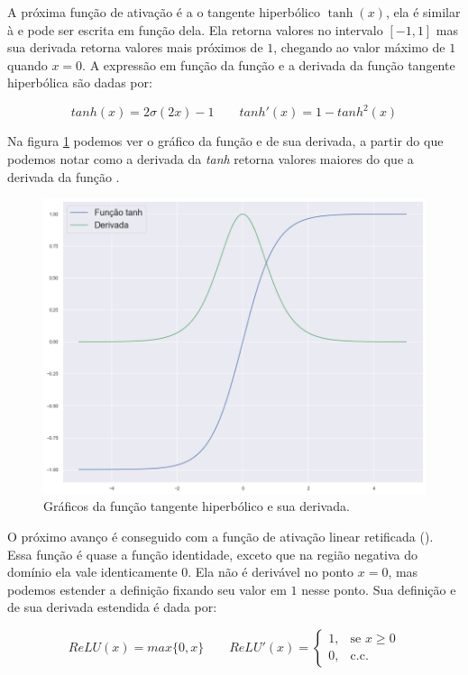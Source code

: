 A próxima função de ativação é a o tangente hiperbólico $\tanh(x)$, ela é similar à  e pode ser escrita em função dela. Ela retorna valores no intervalo $[-1, 1]$ mas sua derivada retorna valores mais próximos de $1$, chegando ao valor máximo de $1$ quando $x = 0$. A expressão em função da função  e a derivada da função tangente hiperbólica são dadas por:

\[ tanh(x)=2\sigma(2x) - 1   \quad \quad  tanh'(x)=1 - tanh^2(x) \]

Na figura \ref{fig:tanh} podemos ver o gráfico da função e de sua derivada, a partir do que podemos notar como a derivada da \emph{tanh} retorna valores maiores do que a derivada da função .

\begin{figure}[htb]
\centering
\includegraphics[width=12cm]{figuras/tanh}
\caption{Gráficos da função tangente hiperbólico e sua derivada.}
\label{fig:tanh}
\end{figure}

O próximo avanço é conseguido com a função de ativação linear retificada (). Essa função é quase a função identidade, exceto que na região negativa do domínio ela vale identicamente $0$. Ela não é derivável no ponto $x=0$, mas podemos estender a definição fixando seu valor em $1$ nesse ponto. Sua definição e de sua derivada estendida é dada por:

\[
ReLU(x)=max\{0, x\}   \quad \quad  ReLU'(x)=
	\begin{cases}
    	1, & \text{se } x\ge 0\\
    	0, & \text{c.c.}
	\end{cases}
\]

